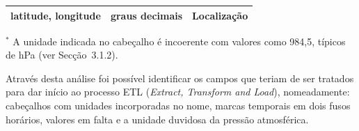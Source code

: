 \begin{table}[htbp]
\begin{tabularx}{\textwidth}{
    @{}
    >{\raggedright\arraybackslash}X
    >{\raggedright\arraybackslash}p{}
    >{\raggedright\arraybackslash}p{}
    @{}
}
latitude, longitude
    & graus decimais & Localização \\

\bottomrule

\end{tabularx}

\vspace{0.2cm}

\begin{minipage}{\textwidth}
\footnotesize
$^{*}$ A unidade indicada no cabeçalho é incoerente
com valores como 984,5, típicos de hPa
(ver Secção~3.1.2).
\end{minipage}

\end{table}

Através desta análise foi possível identificar os campos que teriam de ser tratados para dar início ao processo ETL (\textit{Extract, Transform and Load}), nomeadamente: cabeçalhos com unidades incorporadas no nome, marcas temporais em dois fusos horários, valores em falta e a unidade duvidosa da pressão atmosférica.









